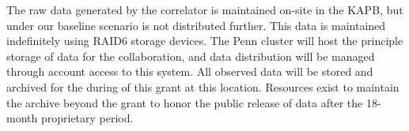 \documentclass[preprint]{aastex}
\begin{document}
The raw data generated by the correlator is maintained on-site in the KAPB, but under our baseline scenario is not distributed further.  This data is maintained indefinitely using RAID6 storage devices.  
The Penn cluster will host the principle storage of data for the collaboration, and data distribution will
be managed through account access to this system.  All observed data will be stored and archived for the during of this grant at this location.  Resources exist to maintain the archive beyond the grant to honor the  public release of data after the 18-month proprietary period.
% 
\end{document}
